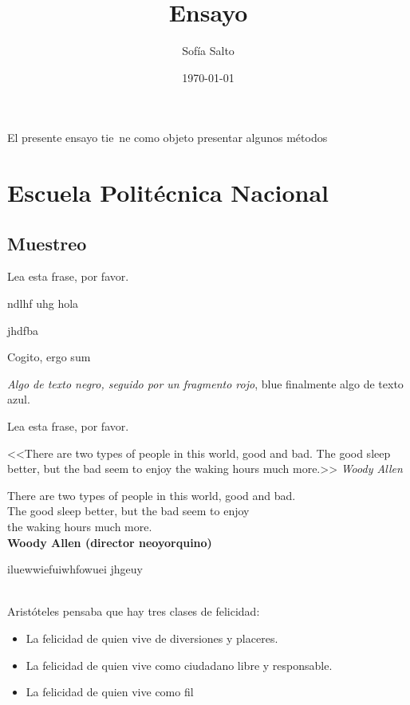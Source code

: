 \documentclass[a4paper,12pt]{article}
\author{Sofía Salto}
\title{Ensayo}
\date{\today}
\begin{document}
	\maketitle
El presente ensayo tie\ ne como objeto presentar algunos métodos

	\section[EPN]{Escuela Politécnica Nacional}

	\subsection{Muestreo}

\textrm{Lea esta frase, por favor.}

\tiny
ndlhf uhg hola

\huge jhdfba


{\LARGE Cogito, ergo sum}

 \emph{Algo de texto negro, \color{red}
seguido por un fragmento rojo}, {\color
{blue} finalmente algo de texto azul.}

\centerline{Lea esta frase, por favor.}

\begin{center}
	<<There are two types of people in this world, good and bad. The good sleep better, but the bad
seem to enjoy the waking hours much more.>>
\emph{Woody Allen}

\end{center}

\begin{flushright}
	There are two types of people in this world, good and bad. \\
 The good sleep better, but the bad seem to enjoy \\
 the waking hours much more. \\
 \textbf{Woody Allen (director neoyorquino)}
 \end{flushright}
 
 \hspace{1cm} iluewwiefuiwhfowuei jhgeuy
 
 \\
 
Aristóteles pensaba que hay tres clases de felicidad:
 \begin{itemize}
 \item La felicidad de quien vive de diversiones y placeres.
 \item La felicidad de quien vive como ciudadano libre y responsable.
 \item La felicidad de quien vive como fil
\end{itemize}
\end{document}
